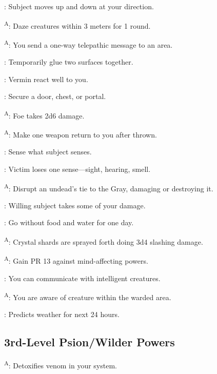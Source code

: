 : Subject moves up and down at your direction.

\textsuperscript{A}: Daze creatures within 3 meters for 1 round.

\textsuperscript{A}: You send a one-way telepathic message to an area.

: Temporarily glue two surfaces together.

: Vermin react well to you.

: Secure a door, chest, or portal.

\textsuperscript{A}: Foe takes 2d6 damage.

\textsuperscript{A}: Make one weapon return to you after thrown.

: Sense what subject senses.

: Victim loses one sense---sight, hearing, smell.

\textsuperscript{A}: Disrupt an undead's tie to the Gray, damaging or destroying it.

: Willing subject takes some of your damage.

: Go without food and water for one day.

\textsuperscript{A}: Crystal shards are sprayed forth doing 3d4 slashing damage.

\textsuperscript{A}: Gain PR 13 against mind-affecting powers.

: You can communicate with intelligent creatures.

\textsuperscript{A}: You are aware of creature within the warded area.

: Predicts weather for next 24 hours.




\subsection{3rd-Level Psion/Wilder Powers}

\textsuperscript{A}: Detoxifies venom in your system.

